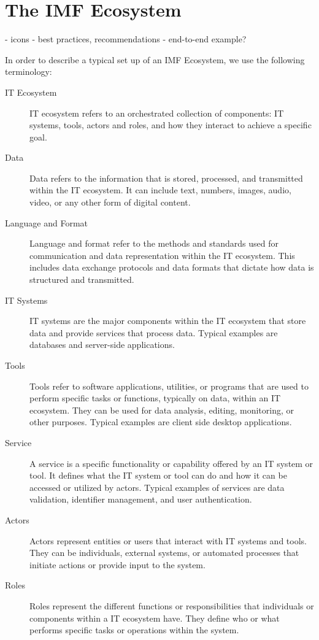 
\section{The IMF Ecosystem}
\label{ch:Chapter 7}

- icons
- best practices, recommendations
- end-to-end example?

In order to describe a typical set up of an IMF Ecosystem, we use the
following terminology:

\begin{description}
\item[{IT Ecosystem}] IT ecosystem refers to an orchestrated
  collection of components: IT systems, tools, actors and roles, and
  how they interact to achieve a specific goal.

\item[{Data}] Data refers to the information that is stored,
  processed, and transmitted within the IT ecosystem. It can include
  text, numbers, images, audio, video, or any other form of digital
  content.

\item[{Language and Format}] Language and format refer to the methods
  and standards used for communication and data representation within
  the IT ecosystem. This includes data exchange protocols and data
  formats that dictate how data is structured and transmitted.

\item[{IT Systems}] IT systems are the major components within the IT
  ecosystem that store data and provide services that process data.
  Typical examples are databases and server-side applications.

\item[{Tools}] Tools refer to software applications, utilities, or
  programs that are used to perform specific tasks or functions,
  typically on data, within an IT ecosystem. They can be used for data
  analysis, editing, monitoring, or other purposes. Typical examples
  are client side desktop applications.

\item[{Service}] A service is a specific functionality or capability
  offered by an IT system or tool. It defines what the IT system or
  tool can do and how it can be accessed or utilized by
  actors. Typical examples of services are data validation, identifier
  management, and user authentication.

\item[{Actors}] Actors represent entities or users that interact with
  IT systems and tools. They can be individuals, external systems, or
  automated processes that initiate actions or provide input to the
  system.

\item[{Roles}] Roles represent the different functions or
  responsibilities that individuals or components within a IT
  ecosystem have. They define who or what performs specific tasks or
  operations within the system.
\end{description}


